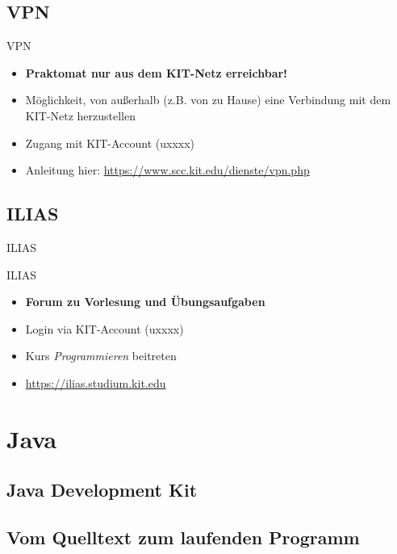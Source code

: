 \documentclass[18pt]{beamer}
\begin{document}
\subsection{VPN}

\begin{frame}{VPN}
    \begin{itemize}
        \item \textbf{\alert{Praktomat nur aus dem KIT-Netz erreichbar!}}
        \item Möglichkeit, von außerhalb (z.B. von zu Hause) eine Verbindung mit dem KIT-Netz herzustellen
        \item Zugang mit KIT-Account (uxxxx)
        \item Anleitung hier: \url{https://www.scc.kit.edu/dienste/vpn.php}
    \end{itemize}
\end{frame}


\subsection{ILIAS}

\begin{frame}{ILIAS}
    \begin{block}{ILIAS}
        \begin{itemize}
            \item \textbf{Forum zu Vorlesung und Übungsaufgaben}
            \item Login via KIT-Account (uxxxx)
            \item Kurs \textit{Programmieren} beitreten
            \item \url{https://ilias.studium.kit.edu}
        \end{itemize}
    \end{block}
\end{frame}


\section{Java}

\subsection{Java Development Kit}

\subsection{Vom Quelltext zum laufenden Programm}
\end{document}
